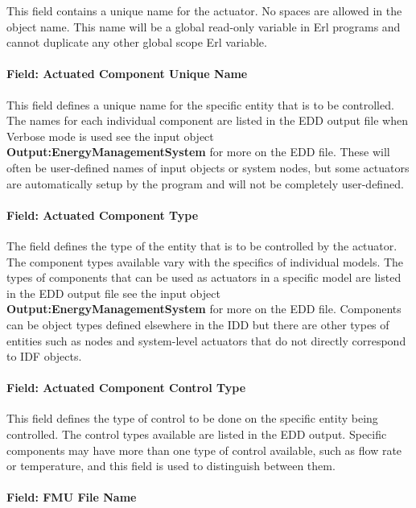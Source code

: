 This field contains a unique name for the actuator. No spaces are allowed in the object name. This name will be a global read-only variable in Erl programs and cannot duplicate any other global scope Erl variable.

\paragraph{Field: Actuated Component Unique Name}\label{field-actuated-component-unique-name-1}

This field defines a unique name for the specific entity that is to be controlled. The names for each individual component are listed in the EDD output file when Verbose mode is used see the input object \textbf{Output:EnergyManagementSystem} for more on the EDD file. These will often be user-defined names of input objects or system nodes, but some actuators are automatically setup by the program and will not be completely user-defined.

\paragraph{Field: Actuated Component Type}\label{field-actuated-component-type-1}

The field defines the type of the entity that is to be controlled by the actuator. The component types available vary with the specifics of individual models. The types of components that can be used as actuators in a specific model are listed in the EDD output file see the input object \textbf{Output:EnergyManagementSystem} for more on the EDD file. Components can be object types defined elsewhere in the IDD but there are other types of entities such as nodes and system-level actuators that do not directly correspond to IDF objects.

\paragraph{Field: Actuated Component Control Type}\label{field-actuated-component-control-type-1}

This field defines the type of control to be done on the specific entity being controlled. The control types available are listed in the EDD output. Specific components may have more than one type of control available, such as flow rate or temperature, and this field is used to distinguish between them.

\paragraph{Field: FMU File Name}\label{field-fmu-file-name-3}

